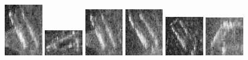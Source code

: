 \begin{figure}
    \includegraphics[width=0.15\textwidth]{chapters/images/dataset/all-class-images/bottle/bottle-387.jpg}
    \includegraphics[width=0.15\textwidth]{chapters/images/dataset/all-class-images/bottle/bottle-64.jpg}
    \includegraphics[width=0.15\textwidth]{chapters/images/dataset/all-class-images/bottle/bottle-325.jpg}
    \includegraphics[width=0.15\textwidth]{chapters/images/dataset/all-class-images/bottle/bottle-258.jpg}
    \includegraphics[width=0.15\textwidth]{chapters/images/dataset/all-class-images/bottle/bottle-185.jpg}
    \includegraphics[width=0.15\textwidth]{chapters/images/dataset/all-class-images/bottle/bottle-27.jpg}
    

\end{figure}
